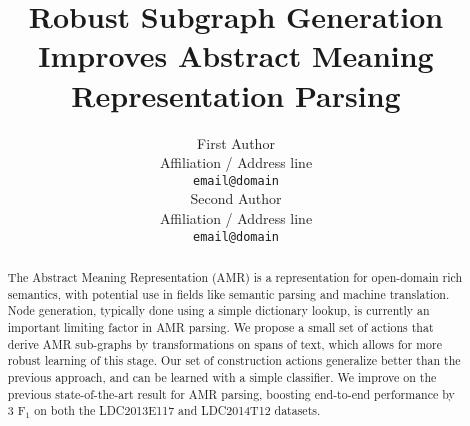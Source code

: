 \documentclass[11pt]{article}
\title{Robust Subgraph Generation Improves Abstract Meaning Representation Parsing}
\author{First Author \\
  Affiliation / Address line \\
  {\tt email@domain} \\\And
  Second Author \\
  Affiliation / Address line \\
  {\tt email@domain} \\}
\date{}
\begin{document}
\maketitle
\begin{abstract}


The Abstract Meaning Representation (AMR) is a representation for open-domain rich semantics, with potential use in fields like semantic parsing and machine translation. Node generation, typically done using a simple dictionary lookup, is currently an important limiting factor in AMR parsing. We propose a small set of actions that derive AMR sub-graphs by transformations on spans of text, which allows for more robust learning of this stage. Our set of construction actions generalize better than the previous approach, and can be learned with a simple classifier. We improve on the previous state-of-the-art result for AMR parsing, boosting end-to-end performance by 3 F$_1$ on both the LDC2013E117 and LDC2014T12 datasets.


\end{abstract}
\end{document}
